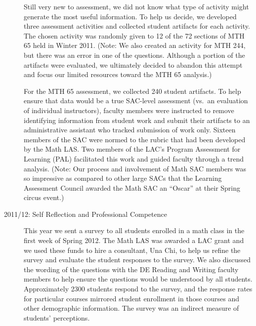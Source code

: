 \begin{description}
Still very new to assessment, we did not know what type of activity might generate the most useful information.  To help us decide, we developed three assessment activities and collected student artifacts for each activity.  The chosen activity was randomly given to 12 of the 72 sections of MTH 65 held in Winter 2011.  (Note: We also created an activity for MTH 244, but there was an error in one of the questions.  Although a portion of the artifacts were evaluated, we ultimately decided to abandon this attempt and focus our limited resources toward the MTH 65 analysis.)

For the MTH 65 assessment, we collected 240 student artifacts.  To help ensure that data would be a true SAC-level assessment (vs.\ an evaluation of individual instructors), faculty members were instructed to remove identifying information from student work and submit their artifacts to an administrative assistant who tracked submission of work only.  Sixteen members of the SAC were normed to the rubric that had been developed by the Math LAS.  Two members of the LAC's Program Assessment for Learning (PAL) facilitated this work and guided faculty through a trend analysis.  (Note: Our process and involvement of Math SAC members was so impressive as compared to other large SACs that the Learning Assessment Council awarded the Math SAC an ``Oscar'' at their Spring circus event.)

\item[2011/12: Self Reflection and Professional Competence]

This year we sent a survey to all students enrolled in a math class in the first week of Spring 2012.  The Math LAS was awarded a LAC grant and we used these funds to hire a consultant, Una Chi, to help us refine the survey and evaluate the student responses to the survey.  We also discussed the wording of the questions with the DE Reading and Writing faculty members to help ensure the questions would be understood by all students. Approximately 2300 students respond to the survey, and the response rates for particular courses mirrored student enrollment in those courses and other demographic information.  The survey was an indirect measure of students' perceptions.  


\end{description}
